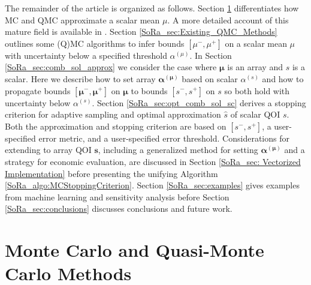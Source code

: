 \documentclass[graybox]{svmult}
\begin{document}
The remainder of the article is organized as follows. Section \ref{SoRa_sec:MCM} differentiates how MC and QMC approximate a scalar mean $\mu$. A more detailed account of this mature field is available in \cite{niederreiter1992random}. Section \ref{SoRa_sec:Existing_QMC_Methods} outlines some (Q)MC algorithms to infer bounds $[\mu^-,\mu^+]$ on a scalar mean $\mu$ with uncertainty below a specified threshold $\alpha^{(\mu)}$. In Section \ref{SoRa_sec:comb_sol_approx} we consider the case where $\boldsymbol{\mu}$ is an array and $s$ is a scalar. Here we describe how to set array $\boldsymbol{\alpha}^{(\boldsymbol{\mu})}$ based on scalar $\alpha^{(s)}$ and how to propagate bounds $[\boldsymbol{\mu}^-,\boldsymbol{\mu}^+]$ on $\boldsymbol{\mu}$ to bounds $[s^-,s^+]$ on $s$ so both hold with uncertainty below $\alpha^{(s)}$. Section \ref{SoRa_sec:opt_comb_sol_sc} derives a stopping criterion for adaptive sampling and optimal approximation $\hat{s}$ of scalar QOI $s$. Both the approximation and stopping criterion are based on $[s^-,s^+]$, a user-specified error metric, and a user-specified error threshold. Considerations for extending to array QOI $\boldsymbol{s}$, including a generalized method for setting $\boldsymbol{\alpha}^{(\boldsymbol{\mu})}$ and a strategy for economic evaluation, are discussed in Section \ref{SoRa_sec: Vectorized Implementation} before presenting the unifying Algorithm \ref{SoRa_algo:MCStoppingCriterion}. Section \ref{SoRa_sec:examples} gives examples from machine learning and sensitivity analysis before Section \ref{SoRa_sec:conclusions} discusses conclusions and future work.   

\section{Monte Carlo and Quasi-Monte Carlo Methods} \label{SoRa_sec:MCM}
\end{document}
